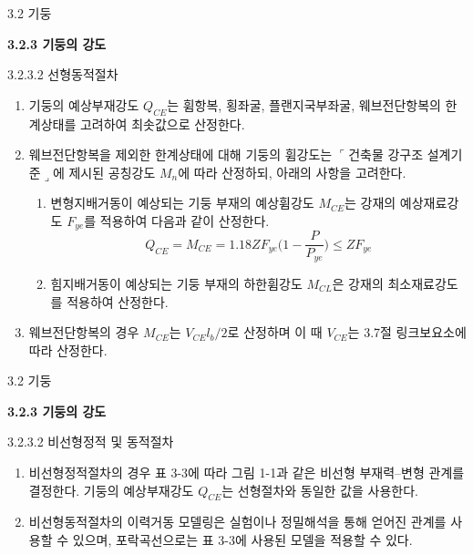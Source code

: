 \begin{frame}{3.2 기둥}

	\textbf{3.2.3 기둥의 강도}

3.2.3.2 선형동적절차

\begin{enumerate}
	\item[(1)] 기둥의 예상부재강도 $Q_{CE}$는 휨항복, 횡좌굴, 플랜지국부좌굴, 웨브전단항복의 한계상태를 고려하여 최솟값으로 산정한다. 
	\item[(2)] 웨브전단항복을 제외한 한계상태에 대해 기둥의 휨강도는 $\ulcorner$건축물 강구조 설계기준$\lrcorner$에 제시된 공칭강도 $M_n$에 따라 산정하되, 아래의 사항을 고려한다. 
	\begin{enumerate}[label=\large\protect\textcircled{\small\arabic*}]
		\item 변형지배거동이 예상되는 기둥 부재의 예상휨강도 $M_{CE}$는 강재의 예상재료강도 $F_{ye}$를 적용하여 다음과 같이 산정한다. 
		\[Q_{CE} = M_{CE} = 1.18ZF_{ye}\Big(1 - \frac{P}{P_{ye}}\Big)\leq ZF_{ye}\]
		\item 힘지배거동이 예상되는 기둥 부재의 하한휨강도 $M_{CL}$은 강재의 최소재료강도를 적용하여 산정한다. 
	\end{enumerate}
	\item[(3)] 웨브전단항복의 경우 $M_{CE}$는 $V_{CE}l_b/2$로 산정하며 이 때 $V_{CE}$는 3.7절 링크보요소에 따라 산정한다.  
\end{enumerate}
\end{frame}	


\begin{frame}{3.2 기둥}

	\textbf{3.2.3 기둥의 강도}

3.2.3.2 비선형정적 및 동적절차

\begin{enumerate}
	\item[(1)] 비선형정적절차의 경우 표 3-3에 따라 그림 1-1과 같은 비선형 부재력--변형 관계를 결정한다. 기둥의 예상부재강도 $Q_{CE}$는 선형절차와 동일한 값을 사용한다. 
	\item[(2)] 비선형동적절차의 이력거동 모델링은 실험이나 정밀해석을 통해 얻어진 관계를 사용할 수 있으며, 포락곡선으로는 표 3-3에 사용된 모델을 적용할 수 있다. 
\end{enumerate}
\end{frame}	


